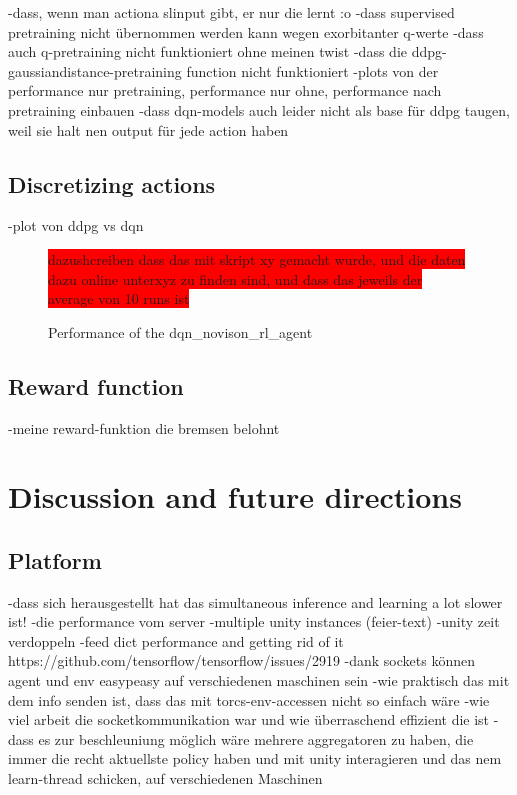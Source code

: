 -dass, wenn man actiona slinput gibt, er nur die lernt :o
-dass supervised pretraining nicht übernommen werden kann wegen exorbitanter q-werte
-dass auch q-pretraining nicht funktioniert ohne meinen twist
-dass die ddpg-gaussiandistance-pretraining function nicht funktioniert
-plots von der performance nur pretraining, performance nur ohne, performance nach pretraining einbauen
-dass dqn-models auch leider nicht als base für ddpg taugen, weil sie halt nen output für jede action haben


\section{Discretizing actions}

-plot von ddpg vs dqn

\begin{figure}[h]
	\colorbox{red}{dazushcreiben dass das mit skript xy gemacht wurde, und die daten dazu online unterxyz zu finden sind, und dass das jeweils der average von 10 runs ist}
	\centering
	\caption{Performance of the dqn\_novison\_rl\_agent}
	\label{fig:dqn_result}
\end{figure}

\section{Reward function}

-meine reward-funktion die bremsen belohnt



\chapter{Discussion and future directions}

\section{Platform}

-dass sich herausgestellt hat das simultaneous inference and learning a lot slower ist!
-die performance vom server
-multiple unity instances (feier-text)
-unity zeit verdoppeln
-feed dict performance and getting rid of it https://github.com/tensorflow/tensorflow/issues/2919
-dank sockets können agent und env easypeasy auf verschiedenen maschinen sein
-wie praktisch das mit dem info senden ist, dass das mit torcs-env-accessen nicht so einfach wäre
-wie viel arbeit die socketkommunikation war und wie überraschend effizient die ist
-dass es zur beschleuniung möglich wäre mehrere aggregatoren zu haben, die immer die recht aktuellste policy haben und mit unity interagieren und das nem learn-thread schicken, auf verschiedenen Maschinen

